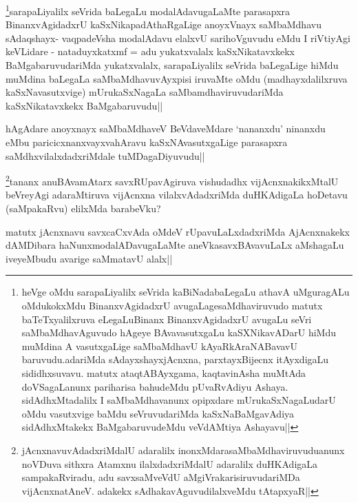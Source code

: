 \begin{artha}
\footnote{heVge oMdu sarapaLiyalilx seVrida kaBiNadabaLegaLu athavA uMguragALu  oMdukokxMdu BinanxvAgidadxrU avugaLagesaMdhaviruvudo matutx baTeTxyalilxruva eLegaLuBinanx BinanxvAgidadxrU avugaLu seVri saMbaMdhavAguvudo hAgeye BAvavasutxgaLu kaSXNikavADarU hiMdu muMdina A vasutxgaLige saMbaMdhavU kAyaRkAraNABavavU baruvudu.adariMda sAdayxshayxjAcnxna, parxtayxBijecnx itAyxdigaLu sididhxsuvavu. matutx ataqtABAyxgama, kaqtavinAsha muMtAda doVSagaLanunx pariharisa bahudeMdu pUvaRvAdiyu Ashaya. sidAdhxMtadalilx I saMbaMdhavanunx opipxdare mUrukaSxNagaLudarU oMdu vasutxvige  baMdu seVruvudariMda kaSxNaBaMgavAdiya sidAdhxMtakekx BaMgabaruvudeMdu veVdAMtiya Ashayavu||}sarapaLiyalilx seVrida baLegaLu modalAdavugaLaMte parasapxra BinanxvAgidadxrU kaSxNikapadAthaRgaLige anoyxVnayx saMbaMdhavu sAdaqshayx- vaqpadeVsha modalAdavu elalxvU sarihoVguvudu eMdu I riVtiyAgi keVLidare - nataduyxkatxmf = adu yukatxvalalx kaSxNikatavxkekx BaMgabaruvudariMda yukatxvalalx, sarapaLiyalilx seVrida baLegaLige hiMdu muMdina baLegaLa saMbaMdhavuvAyxpisi iruvaMte oMdu (madhayxdalilxruva kaSxNavasutxvige) mUrukaSxNagaLa saMbamdhaviruvudariMda kaSxNikatavxkekx BaMgabaruvudu||
\end{artha}

\begin{artha}
hAgAdare anoyxnayx saMbaMdhaveV BeVdaveMdare `nananxdu' ninanxdu eMbu paricicxnanxvayxvahAravu kaSxNAvasutxgaLige parasapxra saMdhxvilalxdadxriMdale tuMDagaDiyuvudu||
\end{artha}

\begin{artha}
\footnote{jAcnxnavuvAdadxriMdalU adaralilx inonxMdarasaMbaMdhaviruvuduanunx noVDuva sithxra Atamxnu ilalxdadxriMdalU adaralilx duHKAdigaLa sampakaRviradu, adu savxsaMveVdU aMgiVrakarisiruvudariMDa vijAcnxnatAneV. adakekx sAdhakavAguvudilalxveMdu tAtapxyaR||}tananx anuBAvamAtarx savxRUpavAgiruva vishudadhx vijAcnxnakikxMtalU beVreyAgi adaraMtiruva vijAcnxna vilalxvAdadxriMda duHKAdigaLa hoDetavu (saMpakaRvu) elilxMda barabeVku?
\end{artha}

\begin{artha}
matutx jAcnxnavu savxcaCxvAda oMdeV rUpavuLaLxdadxriMda AjAcnxnakekx dAMDibara haNunxmodalADavugaLaMte aneVkasavxBAvavuLaLx aMshagaLu iveyeMbudu avarige saMmatavU alalx||
\end{artha}

